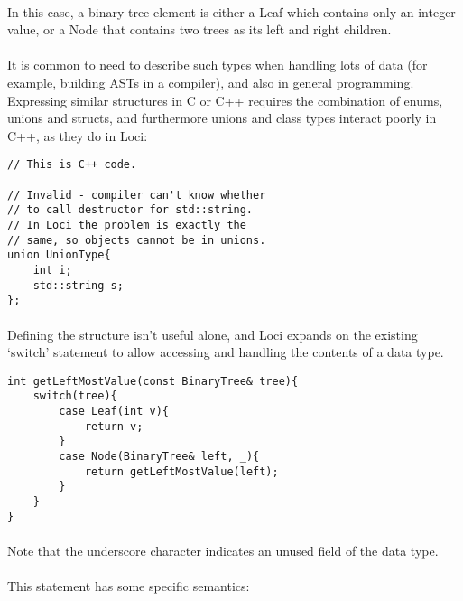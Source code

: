 \documentclass[12pt,twoside,notitlepage]{report}
\begin{document}
\paragraph{}
In this case, a binary tree element is either a Leaf which contains only an integer value, or a Node that contains two trees as its left and right children.

\paragraph{}
It is common to need to describe such types when handling lots of data (for example, building ASTs in a compiler), and also in general programming. Expressing similar structures in C or C++ requires the combination of enums, unions and structs, and furthermore unions and class types interact poorly in C++, as they do in Loci:

\begin{lstlisting}
// This is C++ code.

// Invalid - compiler can't know whether
// to call destructor for std::string.
// In Loci the problem is exactly the
// same, so objects cannot be in unions.
union UnionType{
	int i;
	std::string s;
};
\end{lstlisting}

\paragraph{}
Defining the structure isn't useful alone, and Loci expands on the existing `switch' statement to allow accessing and handling the contents of a data type.


\begin{lstlisting}
int getLeftMostValue(const BinaryTree& tree){
	switch(tree){
		case Leaf(int v){
			return v;
		}
		case Node(BinaryTree& left, _){
			return getLeftMostValue(left);
		}
	}
}
\end{lstlisting}

\paragraph{}
Note that the underscore character indicates an unused field of the data type.

\paragraph{}
This statement has some specific semantics:
\end{document}
